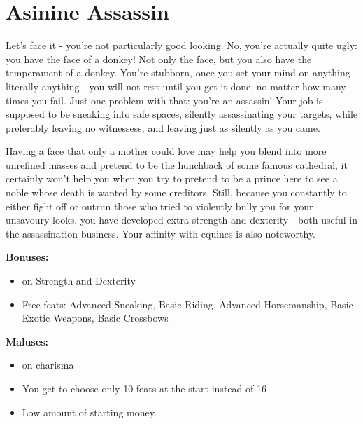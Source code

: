 \section{Asinine Assassin}
Let's face it - you're not particularly good looking. No, you're actually quite ugly: you have the face of a donkey! Not only the face, but you also have the temperament of a donkey. You're stubborn, once you set your mind on anything - literally anything - you will not rest until you get it done, no matter how many times you fail. Just one problem with that: you're an assassin! Your job is supposed to be sneaking into safe spaces, silently assassinating your targets, while preferably leaving no witnessess, and leaving just as silently as you came.

Having a face that only a mother could love may help you blend into more unrefined masses and pretend to be the hunchback of some famous cathedral, it certainly won't help you when you try to pretend to be a prince here to see a noble whose death is wanted by some creditors. Still, because you constantly to either fight off or outrun those who tried to violently bully you for your unsavoury looks, you have developed extra strength and dexterity - both useful in the assassination business. Your affinity with equines is also noteworthy.


\textbf{Bonuses:}
\begin{itemize}
	\item {} on Strength and Dexterity
	\item Free feats: Advanced Sneaking, Basic Riding, Advanced Horsemanship, Basic Exotic Weapons, Basic Crossbows
\end{itemize}


\textbf{Maluses:}
\begin{itemize}
	\item {} on charisma
	\item You get to choose only 10 feats at the start instead of 16
	\item Low amount of starting money.
\end{itemize}
